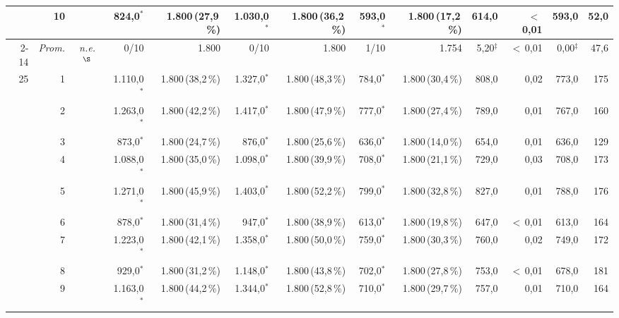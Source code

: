 \documentclass[11pt,a4paper]{article}
\begin{document}
\begin{table}[htbp]
{\begin{tabular}{rr rr rr rr rr rr rr}
 & 10 &  &  & 824{,}0$^{*}$ & 1.800\,{\scriptsize(27{,}9\,\%)} & 1.030{,}0$^{*}$ & 1.800\,{\scriptsize(36{,}2\,\%)} & 593{,}0$^{*}$ & 1.800\,{\scriptsize(17{,}2\,\%)} & 614{,}0 & $<$\,0{,}01 & 593{,}0 & 52{,}0 \\
\cmidrule(l){2-14}
 & \emph{Prom.} & \multicolumn{2}{c}{\textit{n.e.}$^{\S}$} & 0/10 & 1.800 & 0/10 & 1.800 & 1/10 & 1.754 & 5{,}20$^{\ddagger}$ & $<$\,0{,}01 & 0{,}00$^{\ddagger}$ & 47{,}6 \\
\midrule
25 & 1 &  &  & 1.110{,}0$^{*}$ & 1.800\,{\scriptsize(38{,}2\,\%)} & 1.327{,}0$^{*}$ & 1.800\,{\scriptsize(48{,}3\,\%)} & 784{,}0$^{*}$ & 1.800\,{\scriptsize(30{,}4\,\%)} & 808{,}0 & 0{,}02 & 773{,}0 & 175 \\
 & 2 &  &  & 1.263{,}0$^{*}$ & 1.800\,{\scriptsize(42{,}2\,\%)} & 1.417{,}0$^{*}$ & 1.800\,{\scriptsize(47{,}9\,\%)} & 777{,}0$^{*}$ & 1.800\,{\scriptsize(27{,}4\,\%)} & 789{,}0 & 0{,}01 & 767{,}0 & 160 \\
 & 3 &  &  & 873{,}0$^{*}$ & 1.800\,{\scriptsize(24{,}7\,\%)} & 876{,}0$^{*}$ & 1.800\,{\scriptsize(25{,}6\,\%)} & 636{,}0$^{*}$ & 1.800\,{\scriptsize(14{,}0\,\%)} & 654{,}0 & 0{,}01 & 636{,}0 & 129 \\
 & 4 &  &  & 1.088{,}0$^{*}$ & 1.800\,{\scriptsize(35{,}0\,\%)} & 1.098{,}0$^{*}$ & 1.800\,{\scriptsize(39{,}9\,\%)} & 708{,}0$^{*}$ & 1.800\,{\scriptsize(21{,}1\,\%)} & 729{,}0 & 0{,}03 & 708{,}0 & 173 \\
 & 5 &  &  & 1.271{,}0$^{*}$ & 1.800\,{\scriptsize(45{,}9\,\%)} & 1.403{,}0$^{*}$ & 1.800\,{\scriptsize(52{,}2\,\%)} & 799{,}0$^{*}$ & 1.800\,{\scriptsize(32{,}8\,\%)} & 827{,}0 & 0{,}01 & 788{,}0 & 176 \\
 & 6 &  &  & 878{,}0$^{*}$ & 1.800\,{\scriptsize(31{,}4\,\%)} & 947{,}0$^{*}$ & 1.800\,{\scriptsize(38{,}9\,\%)} & 613{,}0$^{*}$ & 1.800\,{\scriptsize(19{,}8\,\%)} & 647{,}0 & $<$\,0{,}01 & 613{,}0 & 164 \\
 & 7 &  &  & 1.223{,}0$^{*}$ & 1.800\,{\scriptsize(42{,}1\,\%)} & 1.358{,}0$^{*}$ & 1.800\,{\scriptsize(50{,}0\,\%)} & 759{,}0$^{*}$ & 1.800\,{\scriptsize(30{,}3\,\%)} & 760{,}0 & 0{,}02 & 749{,}0 & 172 \\
 & 8 &  &  & 929{,}0$^{*}$ & 1.800\,{\scriptsize(31{,}2\,\%)} & 1.148{,}0$^{*}$ & 1.800\,{\scriptsize(43{,}8\,\%)} & 702{,}0$^{*}$ & 1.800\,{\scriptsize(27{,}8\,\%)} & 753{,}0 & $<$\,0{,}01 & 678{,}0 & 181 \\
 & 9 &  &  & 1.163{,}0$^{*}$ & 1.800\,{\scriptsize(44{,}2\,\%)} & 1.344{,}0$^{*}$ & 1.800\,{\scriptsize(52{,}8\,\%)} & 710{,}0$^{*}$ & 1.800\,{\scriptsize(29{,}7\,\%)} & 757{,}0 & 0{,}01 & 710{,}0 & 164 \\

\end{tabular}}
\end{table}
\end{document}
